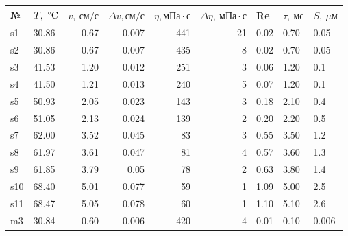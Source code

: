 \documentclass[a4paper, 12pt]{article}
\begin{document}
\begin{table}
    \begin{center}
        \begin{tabular}{|l|l|rr|rr|lll|}
            \hline
            {№} & {$T,\ \text{\textdegree C}$} & {$v,\ \text{см}/\text{с}$} & {$\Delta v, \text{см}/\text{с}$} & {$\eta, \text{мПа} \cdot \text{с}$} & {$\Delta\eta,\ \text{мПа}\cdot\text{с}$} & {Re} & {$\tau,\ \text{мс}$} & {$S,\ \mu\text{м}$} \\
            \hline
            s1  & 30.86           & 0.67        & 0.007              & 441            & 21                   & 0.02 & 0.70         & 0.05        \\
            s2  & 30.86           & 0.67        & 0.007              & 435            & 8                    & 0.02 & 0.70         & 0.05        \\
            s3  & 41.53           & 1.20        & 0.012              & 251            & 3                    & 0.06 & 1.20         & 0.1         \\
            s4  & 41.50           & 1.21        & 0.013              & 240            & 5                    & 0.07 & 1.20         & 0.1         \\
            s5  & 50.93           & 2.05        & 0.023              & 143            & 3                    & 0.18 & 2.10         & 0.4         \\
            s6  & 51.05           & 2.13        & 0.024              & 139            & 2                    & 0.20 & 2.20         & 0.5         \\
            s7  & 62.00           & 3.52        & 0.045              & 83             & 3                    & 0.55 & 3.50         & 1.2         \\
            s8  & 61.97           & 3.61        & 0.047              & 81             & 4                    & 0.57 & 3.60         & 1.3         \\
            s9  & 61.85           & 3.79        & 0.05               & 78             & 2                    & 0.63 & 3.80         & 1.4         \\
            s10 & 68.40           & 5.01        & 0.077              & 59             & 1                    & 1.09 & 5.00         & 2.5         \\
            s11 & 68.47           & 5.05        & 0.078              & 60             & 1                    & 1.10 & 5.10         & 2.6         \\\hline
            m3  & 30.84           & 0.60        & 0.006              & 420            & 4                    & 0.01 & 0.10         & 0.006       \\

\end{tabular}
\end{center}
\end{table}
\end{document}
